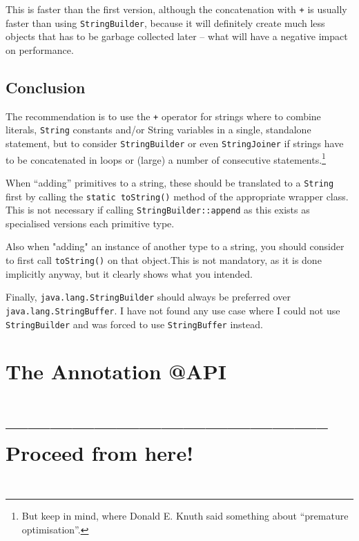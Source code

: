 \documentclass[11pt,a4paper, titlepage, parskip=half, headsepline, footsepline, cleardoublepage=current, headheight=1cm]{scrbook}
\begin{document}
This is faster than the first version, although the concatenation with \verb#+# is usually faster than using \lstinline|StringBuilder|, because it will definitely create much less objects that has to be garbage collected later – what will have a negative impact on performance.

\subsection{Conclusion}
The recommendation is to use the \verb#+# operator for strings where to combine literals, \lstinline|String| constants and/or String variables in a single, standalone statement, but to consider \lstinline|StringBuilder| or even \lstinline|StringJoiner| if strings have to be concatenated in loops or (large) a number of consecutive statements.\footnote{But keep \autocite{Knuth:PrematureOptimization} in mind, where Donald E. Knuth said something about “premature optimisation”.}

When “adding” primitives to a string, these should be translated to a \lstinline|String| first by calling the \lstinline|static toString()| method of the appropriate wrapper class. This is not necessary if calling \lstinline|StringBuilder::append| as this exists as specialised versions each primitive type.

Also when "adding" an instance of another type to a string, you should consider to first call \lstinline|toString()| on that object.This is not mandatory, as it is done implicitly anyway, but it clearly shows what you intended.

Finally, \lstinline|java.lang.StringBuilder| should always be preferred over \lstinline|java.lang.StringBuffer|. I have not found any use case where I could not use \lstinline|StringBuilder| and was forced to use \lstinline|StringBuffer| instead.

\section{The Annotation @API}\label{sec:APIAnnotation}
\section{-------------------------------------------- Proceed from here!}
\lipsum[1]

\begin{lstlisting}
\end{lstlisting}

\begin{lstlisting}
\end{lstlisting}
\end{document}
